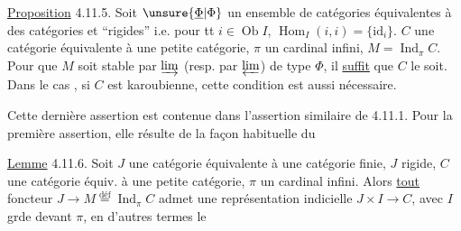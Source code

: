 \uline{Proposition} 4.11.5. Soit $\unsure{\underline{\Phi}|\Phi}$ un ensemble de  catégories  équivalentes à des  catégories  et ``rigides'' i.e. pour tt $i\in\operatorname{Ob} I$,  $\operatorname{Hom}_I(i,i)=\{\mathrm{id}_i\}$.
  $C$ une catégorie équivalente à une petite catégorie, $\pi$ un cardinal infini, $M=\operatorname{Ind}_\pi C$. Pour que $M$ soit stable par $\varinjlim$ (resp. par $\varprojlim$) de type $\Phi$, il \uline{suffit} que $C$ le soit. Dans le cas , si $C$ est karoubienne, cette condition est aussi nécessaire.

Cette dernière assertion est contenue dans l'assertion similaire de 4.11.1. Pour la première assertion, elle résulte de la façon habituelle du

\uline{Lemme} 4.11.6. Soit $J$ une catégorie équivalente à une  catégorie finie, $J$ rigide,  $C$ une catégorie équiv. à une petite catégorie, $\pi$ un cardinal infini.
Alors \uline{tout} foncteur  $J\longrightarrow M\overset{\mathrm{déf}}{=}\operatorname{Ind}_\pi C$ admet une représentation indicielle $J\times I\longrightarrow C$, avec $I$ grde devant $\pi$, en d'autres termes le
